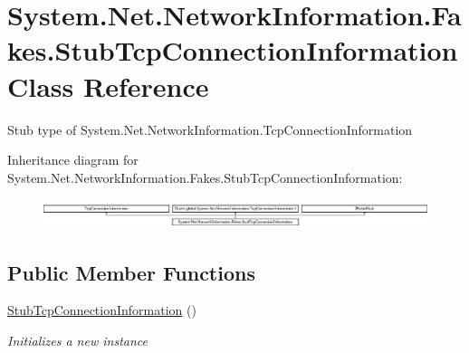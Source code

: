 \hypertarget{class_system_1_1_net_1_1_network_information_1_1_fakes_1_1_stub_tcp_connection_information}{\section{System.\-Net.\-Network\-Information.\-Fakes.\-Stub\-Tcp\-Connection\-Information Class Reference}
\label{class_system_1_1_net_1_1_network_information_1_1_fakes_1_1_stub_tcp_connection_information}
}


Stub type of System.\-Net.\-Network\-Information.\-Tcp\-Connection\-Information 


Inheritance diagram for System.\-Net.\-Network\-Information.\-Fakes.\-Stub\-Tcp\-Connection\-Information\-:\begin{figure}[H]
\begin{center}
\leavevmode
\includegraphics[height=0.856269cm]{class_system_1_1_net_1_1_network_information_1_1_fakes_1_1_stub_tcp_connection_information}
\end{center}
\end{figure}
\subsection*{Public Member Functions}
\begin{DoxyCompactItemize}
\item 
\hyperlink{class_system_1_1_net_1_1_network_information_1_1_fakes_1_1_stub_tcp_connection_information_a8e696cef3456e3bca7166c975666b35e}{Stub\-Tcp\-Connection\-Information} ()
\begin{DoxyCompactList}\small\item\em Initializes a new instance\end{DoxyCompactList}\end{DoxyCompactItemize}
